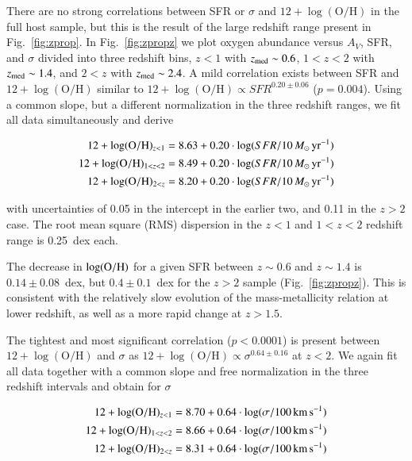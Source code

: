 \documentclass[traditabstract, longauth]{aa}
\newcommand{\oh}{12+\log(\mathrm{O/H})}
\begin{document}
There are no strong correlations between SFR or $\sigma$ and $\oh$ in the full host sample, but this is the result of the large redshift range present in Fig.~\ref{fig:zprop}. In Fig.~\ref{fig:zpropz} we plot oxygen abundance versus $A_V$, SFR, and $\sigma$ divided into three redshift bins, $z<1$ with $z_{\rm{med}}\sim0.6$, $1<z<2$ with $z_{\rm{med}}\sim1.4$, and $2<z$ with $z_{\rm{med}}\sim2.4$. A mild correlation exists between SFR and $\oh$ similar to $\oh\propto {SFR}^{0.20\pm0.06}$ ($p=0.004$). Using a common slope, but a different normalization in the three redshift ranges, we fit all data simultaneously and derive

\begin{equation}
\label{eq:ohsfr}
\begin{split}
\oh_{z<1} = 8.63 + 0.20\cdot \log({SFR/10\,M_\odot\,\rm{yr}^{-1}}) \\
\oh_{1<z<2} = 8.49 + 0.20\cdot \log({SFR/10\,M_\odot\,\rm{yr}^{-1}})  \\
\oh_{2<z} = 8.20 + 0.20\cdot \log({SFR/10\,M_\odot\,\rm{yr}^{-1}})  \\
\end{split}
\end{equation}

 {with uncertainties of 0.05 in the intercept in the earlier two, and 0.11 in the $z>2$ case. The root mean square (RMS) dispersion in the $z<1$ and $1<z<2$ redshift range is 0.25~dex each.}

The decrease in $\log(\rm{O/H})$ for a given SFR between $z\sim0.6$ and $z\sim1.4$ is $0.14\pm0.08$~dex, but $0.4\pm0.1$~dex for the $z > 2$ sample (Fig.~\ref{fig:zpropz}). This is consistent with the relatively slow evolution of the mass-metallicity relation at lower redshift, as well as a more rapid change at $z > 1.5$. 

The tightest and most significant correlation ($p<0.0001$) is present between $\oh$ and $\sigma$ as $\oh\propto\sigma^{0.64\pm0.16}$ at $z<2$. We again fit all data together with a common slope and free normalization in the three redshift intervals and obtain for $\sigma$

\begin{equation}
\label{eq:ohsigma}
\begin{split}
\oh_{z<1} = 8.70 + 0.64\cdot \log(\sigma/\rm{100\,km\,s^{-1}}) \\
\oh_{1<z<2} = 8.66 + 0.64\cdot \log(\sigma/\rm{100\,km\,s^{-1}}) \\
\oh_{2<z} = 8.31 + 0.64\cdot \log(\sigma/\rm{100\,km\,s^{-1}})
\end{split}
\end{equation}
\end{document}

